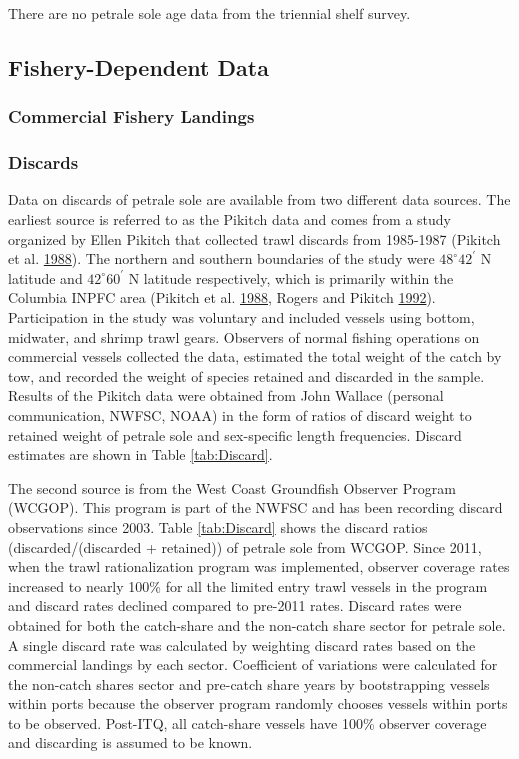 \documentclass[12pt,]{article}
\begin{document}
There are no petrale sole age data from the triennial shelf survey.

\subsection{Fishery-Dependent Data}\label{fishery-dependent-data}

\subsubsection{Commercial Fishery
Landings}\label{commercial-fishery-landings}

\subsubsection{Discards}\label{discards}

Data on discards of petrale sole are available from two different data
sources. The earliest source is referred to as the Pikitch data and
comes from a study organized by Ellen Pikitch that collected trawl
discards from 1985-1987 (Pikitch et al.
\protect\hyperlink{ref-pikitch_evaluation_1988}{1988}). The northern and
southern boundaries of the study were \(48^\circ 42^\prime\) N latitude
and \(42^\circ 60^\prime\) N latitude respectively, which is primarily
within the Columbia INPFC area (Pikitch et al.
\protect\hyperlink{ref-pikitch_evaluation_1988}{1988}, Rogers and
Pikitch \protect\hyperlink{ref-rogers_numerical_1992}{1992}).
Participation in the study was voluntary and included vessels using
bottom, midwater, and shrimp trawl gears. Observers of normal fishing
operations on commercial vessels collected the data, estimated the total
weight of the catch by tow, and recorded the weight of species retained
and discarded in the sample. Results of the Pikitch data were obtained
from John Wallace (personal communication, NWFSC, NOAA) in the form of
ratios of discard weight to retained weight of petrale sole and
sex-specific length frequencies. Discard estimates are shown in Table
\ref{tab:Discard}.

The second source is from the West Coast Groundfish Observer Program
(WCGOP). This program is part of the NWFSC and has been recording
discard observations since 2003. Table \ref{tab:Discard} shows the
discard ratios (discarded/(discarded + retained)) of petrale sole from
WCGOP. Since 2011, when the trawl rationalization program was
implemented, observer coverage rates increased to nearly 100\% for all
the limited entry trawl vessels in the program and discard rates
declined compared to pre-2011 rates. Discard rates were obtained for
both the catch-share and the non-catch share sector for petrale sole. A
single discard rate was calculated by weighting discard rates based on
the commercial landings by each sector. Coefficient of variations were
calculated for the non-catch shares sector and pre-catch share years by
bootstrapping vessels within ports because the observer program randomly
chooses vessels within ports to be observed. Post-ITQ, all catch-share
vessels have 100\% observer coverage and discarding is assumed to be
known.
\end{document}
